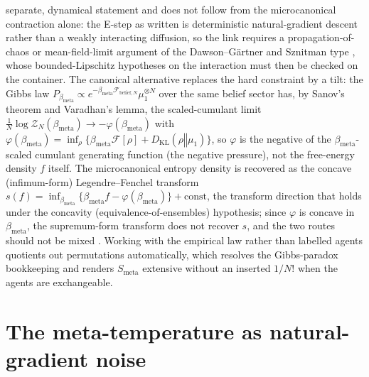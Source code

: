 \documentclass[11pt]{article}
\theoremstyle{plain}
\theoremstyle{definition}
\newcommand{\KL}[2]{D_{\mathrm{KL}}\mathopen{}\left(#1 \mathbin{\Vert} #2\right)\mathclose{}}
\newcommand{\Fcal}{\mathcal{F}}
\newcommand{\Zcal}{\mathcal{Z}}
\newcommand{\Smeta}{S_{\mathrm{meta}}}
\newcommand{\bmeta}{\beta_{\mathrm{meta}}}
\begin{document}
separate, dynamical statement and does not follow from the microcanonical contraction
alone: the E-step as written is deterministic natural-gradient descent rather than a weakly
interacting diffusion, so the link requires a propagation-of-chaos or mean-field-limit
argument of the Dawson--G\"artner and Sznitman type
\citep{dawson1987large,sznitman1991topics}, whose bounded-Lipschitz hypotheses on the
interaction must then be checked on the container. The canonical alternative replaces the hard
constraint by a tilt: the Gibbs law $P_{\bmeta}\propto e^{-\bmeta\Fcal_{\mathrm{belief},N}}\mu_1^{\otimes N}$ over the same belief sector
has, by Sanov's theorem and Varadhan's lemma, the scaled-cumulant limit
$\tfrac1N\log\Zcal_N(\bmeta)\to-\varphi(\bmeta)$ with
$\varphi(\bmeta)=\inf_{\rho}\{\bmeta\Fcal[\rho]+\KL{\rho}{\mu_1}\}$, so $\varphi$ is the
negative of the $\bmeta$-scaled cumulant generating function (the negative pressure), not the free-energy density
$f$ itself. The microcanonical entropy density is recovered as the concave (infimum-form)
Legendre--Fenchel transform $s(f)=\inf_{\bmeta}\{\bmeta f-\varphi(\bmeta)\}+\text{const}$, the
transform direction that holds under the concavity (equivalence-of-ensembles) hypothesis; since
$\varphi$ is concave in $\bmeta$, the supremum-form transform does not recover $s$, and the two
routes should not be mixed \citep{ellis1985entropy,touchette2009large}. Working with the empirical law rather than
labelled agents quotients out permutations automatically, which resolves the
Gibbs-paradox bookkeeping and renders $\Smeta$ extensive without an inserted $1/N!$ when
the agents are exchangeable.

\section{The meta-temperature as natural-gradient noise}
\label{sec:temperature}
\end{document}
